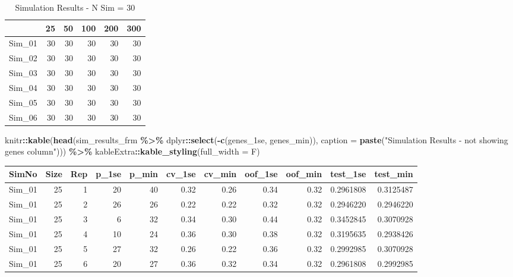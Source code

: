 \documentclass[
]{book}
\newenvironment{Shaded}{\begin{snugshade}}{\end{snugshade}}
\newcommand{\DataTypeTok}[1]{\textcolor[rgb]{0.13,0.29,0.53}{#1}}
\newcommand{\KeywordTok}[1]{\textcolor[rgb]{0.13,0.29,0.53}{\textbf{#1}}}
\newcommand{\NormalTok}[1]{#1}
\newcommand{\OperatorTok}[1]{\textcolor[rgb]{0.81,0.36,0.00}{\textbf{#1}}}
\newcommand{\StringTok}[1]{\textcolor[rgb]{0.31,0.60,0.02}{#1}}
\begin{document}
\begin{table}

\caption{\label{tab:sum-table}Simulation Results - N Sim = 30}
\centering
\begin{tabular}[t]{l|r|r|r|r|r}
\hline
  & 25 & 50 & 100 & 200 & 300\\
\hline
Sim\_01 & 30 & 30 & 30 & 30 & 30\\
\hline
Sim\_02 & 30 & 30 & 30 & 30 & 30\\
\hline
Sim\_03 & 30 & 30 & 30 & 30 & 30\\
\hline
Sim\_04 & 30 & 30 & 30 & 30 & 30\\
\hline
Sim\_05 & 30 & 30 & 30 & 30 & 30\\
\hline
Sim\_06 & 30 & 30 & 30 & 30 & 30\\
\hline
\end{tabular}
\end{table}

\begin{Shaded}
\begin{Highlighting}[]
\NormalTok{knitr}\OperatorTok{::}\KeywordTok{kable}\NormalTok{(}\KeywordTok{head}\NormalTok{(sim\_results\_frm }\OperatorTok{\%>\%}\StringTok{ }\NormalTok{dplyr}\OperatorTok{::}\KeywordTok{select}\NormalTok{(}\OperatorTok{{-}}\KeywordTok{c}\NormalTok{(genes\_1se, genes\_min)),}
    \DataTypeTok{caption =} \KeywordTok{paste}\NormalTok{(}\StringTok{"Simulation Results {-} not showing genes column"}\NormalTok{))) }\OperatorTok{\%>\%}
\StringTok{   }\NormalTok{kableExtra}\OperatorTok{::}\KeywordTok{kable\_styling}\NormalTok{(}\DataTypeTok{full\_width =}\NormalTok{ F)}
\end{Highlighting}
\end{Shaded}

\begin{table}[H]
\centering
\begin{tabular}{l|r|r|r|r|r|r|r|r|r|r}
\hline
SimNo & Size & Rep & p\_1se & p\_min & cv\_1se & cv\_min & oof\_1se & oof\_min & test\_1se & test\_min\\
\hline
Sim\_01 & 25 & 1 & 20 & 40 & 0.32 & 0.26 & 0.34 & 0.32 & 0.2961808 & 0.3125487\\
\hline
Sim\_01 & 25 & 2 & 26 & 26 & 0.22 & 0.22 & 0.32 & 0.32 & 0.2946220 & 0.2946220\\
\hline
Sim\_01 & 25 & 3 & 6 & 32 & 0.34 & 0.30 & 0.44 & 0.32 & 0.3452845 & 0.3070928\\
\hline
Sim\_01 & 25 & 4 & 10 & 24 & 0.36 & 0.30 & 0.38 & 0.32 & 0.3195635 & 0.2938426\\
\hline
Sim\_01 & 25 & 5 & 27 & 32 & 0.26 & 0.22 & 0.36 & 0.32 & 0.2992985 & 0.3070928\\
\hline
Sim\_01 & 25 & 6 & 20 & 27 & 0.36 & 0.32 & 0.34 & 0.32 & 0.2961808 & 0.2992985\\
\hline
\end{tabular}
\end{table}
\end{document}
